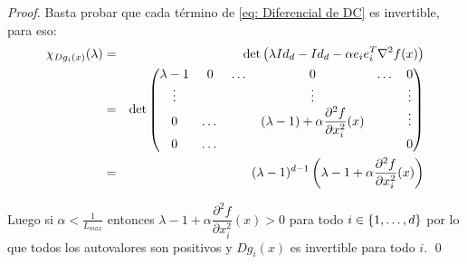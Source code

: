 \begin{proof}
	Basta probar que cada t\'ermino de \ref{eq: Diferencial de DC} es invertible, para eso:
	\begin{equation*}
	\begin{aligned}
	\chi_{Dg_i(x)}(\lambda) & = & \det\left(
			\lambda Id_d - Id_d - \alpha e_ie_i^{T} \nabla ^2 f(x)
		\right) \\
		& = & \det\left(
				\begin{matrix}
					\lambda -1 & 0 & \dots & 0 & \dots & 0 \\
					\vdots & & & \vdots & & \vdots \\
					0 & \dots & & (\lambda - 1) + \alpha\dfrac{\partial^2 f}{\partial x_i^2}(x) & & \vdots \\
					0 & \dots & & & & 0 
				\end{matrix}
			\right) \\
			& = & (\lambda -1)^{d-1}\left(\lambda -1 + \alpha\dfrac{\partial^2 f}{\partial x_i^2}(x) \right)
	\end{aligned}
	\end{equation*}
	
	Luego si $\alpha < \frac{1}{L_{max}}$ entonces $\lambda -1 + \alpha\dfrac{\partial^2 f}{\partial x_i^2}(x) > 0$ para todo $i \in \left\lbrace1, \dots, d\right\rbrace$ por lo que todos los autovalores son positivos y $Dg_i(x)$ es invertible para todo $i$. \qed
	
\end{proof}